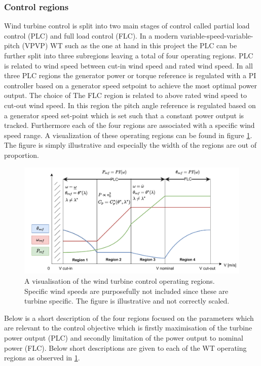 \subsubsection{Control regions} \label{sec:theyry_ctrl_regions}
Wind turbine control is split into two main stages of control called partial load control (PLC) and full load control (FLC). In a modern variable-speed-variable-pitch (VPVP) WT such as the one at hand in this project the PLC can be further split into three subregions leaving a total of four operating regions. PLC is related to wind speed between cut-in wind speed and rated wind speed. In all three PLC regions the generator power or torque reference is regulated with a PI controller based on a generator speed setpoint to achieve the most optimal power output. The choice of  The FLC region is related to above rated wind speed to cut-out wind speed. In this region the pitch angle reference is regulated based on a generator speed set-point which is set such that a constant power output is tracked. Furthermore each of the four regions are associated with a specific wind speed range. A visualization of these operating regions can be found in figure \cref{fig:operating_regions}. The figure is simply illustrative and especially the width of the regions are out of proportion. 
\begin{figure}[ht]
	\centering
	\includegraphics[width=0.9\linewidth]{Graphics/OperatingRegions.pdf}
	\caption{A visualisation of the wind turbine control operating regions. Specific wind speeds are purposefully not included since these are turbine specific. The figure is illustrative and not correctly scaled.}
	\label{fig:operating_regions}
\end{figure}
Below is a short description of the four regions focused on the parameters which are relevant to the control objective which is firstly maximisation of the turbine power output (PLC) and secondly limitation of the power output to nominal power (FLC). Below short descriptions are given to each of the WT operating regions as observed in \cref{fig:operating_regions}.
